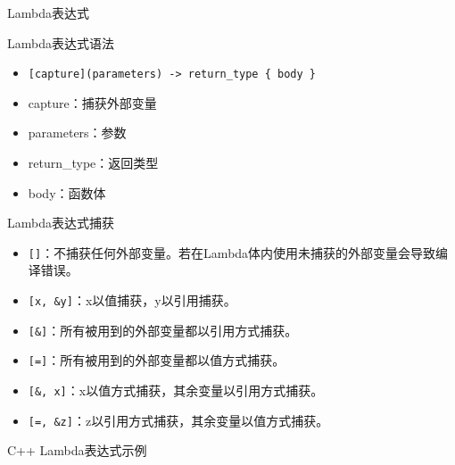\documentclass[UTF8,aspectratio=169]{beamer}
\begin{document}
\begin{frame}{Lambda表达式}
    \begin{ytublock}{Lambda表达式语法}
        \begin{itemize}
            \item \texttt{[capture](parameters) -> return\_type \{ body \}}
            \item capture：捕获外部变量
            \item parameters：参数
            \item return\_type：返回类型
            \item body：函数体
        \end{itemize}
    \end{ytublock}

    \begin{ytublock}{Lambda表达式捕获}
        \begin{itemize}
            \item \texttt{[]}：不捕获任何外部变量。若在Lambda体内使用未捕获的外部变量会导致编译错误。
            \item \texttt{[x, \&y]}：x以值捕获，y以引用捕获。
            \item \texttt{[\&]}：所有被用到的外部变量都以引用方式捕获。
            \item \texttt{[=]}：所有被用到的外部变量都以值方式捕获。
            \item \texttt{[\&, x]}：x以值方式捕获，其余变量以引用方式捕获。
            \item \texttt{[=, \&z]}：z以引用方式捕获，其余变量以值方式捕获。
        \end{itemize}
    \end{ytublock}
\end{frame}

\begin{frame}[fragile]{C++ Lambda表达式示例}
    \inputminted[firstline=1,lastline=18]{cpp}{code/cpp_lambda_example.cpp}
\end{frame}
\end{document}
